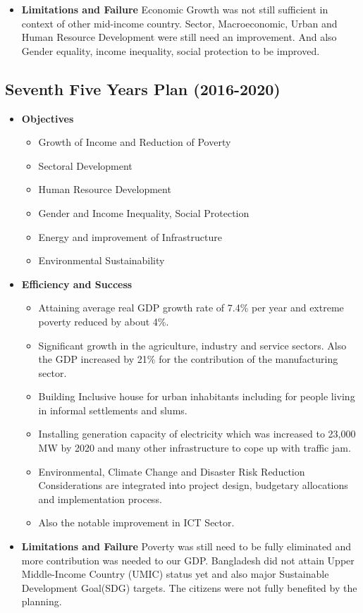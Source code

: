 \begin{itemize}
	\item\textbf{Limitations and Failure}
	Economic Growth was not still sufficient in context of other mid-income country. Sector, Macroeconomic, 
	Urban and Human Resource Development were still need an improvement. And also Gender equality, 
	income inequality, social protection to be improved.
\end{itemize}

\vspace{0.2cm}

\subsection{Seventh Five Years Plan (2016-2020)}

\begin{itemize}
	\item\textbf{Objectives}
	\begin{itemize}
		\item Growth of Income and Reduction of Poverty
		\item Sectoral Development
		\item Human Resource Development
		\item Gender and Income Inequality, Social Protection
		\item Energy and improvement of Infrastructure
		\item Environmental Sustainability
	\end{itemize}		
	
	\item\textbf{Efficiency and Success}
	\begin{itemize}
		\item Attaining average real GDP growth rate of 7.4\% per year and extreme poverty reduced by about 4\%.
		\item Significant growth in the agriculture, industry and service sectors. Also the GDP increased by 21\% 
		for the contribution of the manufacturing sector.
		\item Building Inclusive house for urban inhabitants including for people living in informal settlements and slums.
		\item Installing generation capacity of electricity which was increased to 23,000 MW by 2020 and many other 
		infrastructure to cope up with traffic jam.
		\item Environmental, Climate Change and Disaster Risk Reduction Considerations are integrated into project design, 
		budgetary allocations and implementation process.
		\item Also the notable improvement in ICT Sector.
	\end{itemize}
	
	\item\textbf{Limitations and Failure}
	Poverty was still need to be fully eliminated and more contribution was needed to our GDP. 
	Bangladesh did not attain Upper Middle-Income Country (UMIC) status yet and also major 
	Sustainable Development Goal(SDG) targets. The citizens were not fully benefited by the planning.
\end{itemize}




